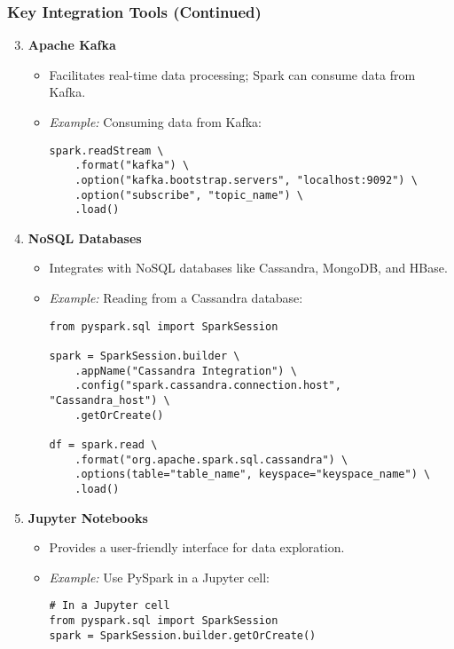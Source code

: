 \documentclass[aspectratio=169]{beamer}
\begin{document}
\begin{frame}
    \frametitle{Key Integration Tools (Continued)}
    \begin{enumerate}
        \setcounter{enumi}{2}
        
        \item \textbf{Apache Kafka}
        \begin{itemize}
            \item Facilitates real-time data processing; Spark can consume data from Kafka.
            \item \textit{Example:} Consuming data from Kafka:
            \begin{lstlisting}[basicstyle=\tiny]
spark.readStream \
    .format("kafka") \
    .option("kafka.bootstrap.servers", "localhost:9092") \
    .option("subscribe", "topic_name") \
    .load()
            \end{lstlisting}
        \end{itemize}
        
        \item \textbf{NoSQL Databases}
        \begin{itemize}
            \item Integrates with NoSQL databases like Cassandra, MongoDB, and HBase.
            \item \textit{Example:} Reading from a Cassandra database:
            \begin{lstlisting}[basicstyle=\tiny]
from pyspark.sql import SparkSession

spark = SparkSession.builder \
    .appName("Cassandra Integration") \
    .config("spark.cassandra.connection.host", "Cassandra_host") \
    .getOrCreate()

df = spark.read \
    .format("org.apache.spark.sql.cassandra") \
    .options(table="table_name", keyspace="keyspace_name") \
    .load()
            \end{lstlisting}
        \end{itemize}
        
        \item \textbf{Jupyter Notebooks}
        \begin{itemize}
            \item Provides a user-friendly interface for data exploration.
            \item \textit{Example:} Use PySpark in a Jupyter cell:
            \begin{lstlisting}[basicstyle=\tiny]
# In a Jupyter cell
from pyspark.sql import SparkSession
spark = SparkSession.builder.getOrCreate()
            \end{lstlisting}
        \end{itemize}
    \end{enumerate}
\end{frame}
\end{document}
